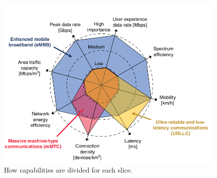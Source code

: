 \documentclass[a4paper,12pt]{report} %
\begin{document}
\begin{figure}[H]
\centering
\includegraphics[scale=0.4]{pics/capabilities2.png}
\caption{How capabilities are divided for each slice. \cite{al20185g}} 
\label{cap2}
\end{figure}




\newpage
\end{document}
